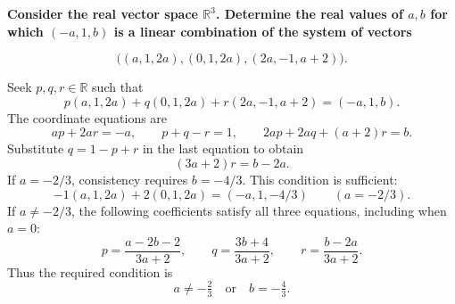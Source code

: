 \providecommand{\rank}{\operatorname{r}}
\providecommand{\RR}{\mathbb R}
\providecommand{\CC}{\mathbb C}
\providecommand{\KK}{\mathbb K}

\setcounter{enumi}{73}
\item {\bfseries\boldmath
Consider the real vector space $\RR^3$. Determine the real values of $a,b$ for which $(-a,1,b)$ is a linear combination of the system of vectors
}

\[
\bigl((a,1,2a),(0,1,2a),(2a,-1,a+2)\bigr).
\]

\begin{answer}
Seek $p,q,r\in\RR$ such that
\[
 p(a,1,2a)+q(0,1,2a)+r(2a,-1,a+2)=(-a,1,b).
\]
The coordinate equations are
\[
 ap+2ar=-a,\qquad p+q-r=1,\qquad 2ap+2aq+(a+2)r=b.
\]
Substitute $q=1-p+r$ in the last equation to obtain
\[
 (3a+2)r=b-2a.
\]
If $a=-2/3$, consistency requires $b=-4/3$. This condition is sufficient:
\[
 -1(a,1,2a)+2(0,1,2a)=(-a,1,-4/3)\qquad(a=-2/3).
\]
If $a\ne-2/3$, the following coefficients satisfy all three equations,
including when $a=0$:
\[
 p=\frac{a-2b-2}{3a+2},\qquad q=\frac{3b+4}{3a+2},\qquad
 r=\frac{b-2a}{3a+2}.
\]
Thus the required condition is
\[
 \boxed{a\ne-\tfrac23\quad\text{or}\quad b=-\tfrac43.}
\]
\end{answer}
